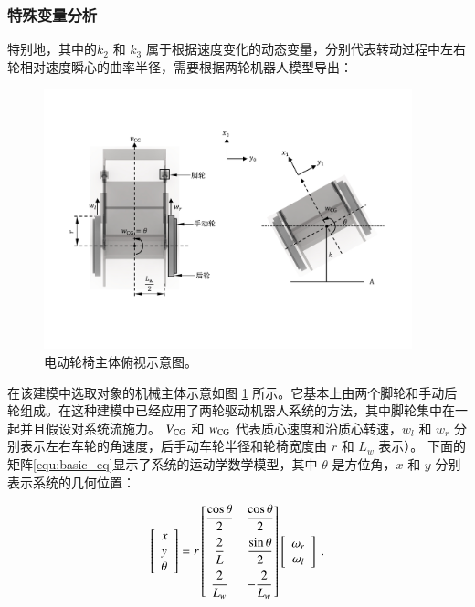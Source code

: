 \subsubsection{特殊变量分析}

特别地，其中的$ k_2 $ 和 $ k_3 $ 属于根据速度变化的动态变量，分别代表转动过程中左右轮相对速度瞬心的曲率半径，需要根据两轮机器人模型导出：

\begin{figure}[!b]
	\centering
	\includegraphics[width=0.95\textwidth]{fig/top_view.pdf}
	\caption{电动轮椅主体俯视示意图。}\label{fig:top_view}
\end{figure}

在该建模中选取对象的机械主体示意如图 \ref{fig:top_view} 所示。它基本上由两个脚轮和手动后轮组成。在这种建模中已经应用了两轮驱动机器人系统的方法，其中脚轮集中在一起并且假设对系统流施力。 
$ V_{\rm{CG}} $ 和 $ w_{\rm{CG}} $ 代表质心速度和沿质心转速，$ w_l $ 和 $ w_r $ 分别表示左右车轮的角速度，后手动车轮半径和轮椅宽度由 $ r $ 和 $ L_w $ 表示）。
下面的矩阵\ref{equ:basic_eq}显示了系统的运动学数学模型，其中 $ \theta $ 是方位角，$ x $ 和 $ y $ 分别表示系统的几何位置：

\begin{equation}
\label{equ:basic_eq}
\begin{bmatrix} \begin{array}{l}{x} \\ {y} \\ {\theta}\end{array} \end{bmatrix}
=
r
\begin{bmatrix}
\vspace{0.2cm} {\dfrac{\cos \theta}{2}} & {\dfrac{\cos \theta}{2}} \\
\vspace{0.2cm} {\dfrac{2}{L}} & {\dfrac{\sin \theta}{2}} \\
{\dfrac{2}{L_w}} & - {\dfrac{2}{L_w}}
\end{bmatrix}
\begin{bmatrix} \begin{array}{c}{\omega_r} \\ {\omega_l}\end{array} \end{bmatrix}
\ .
\end{equation}

